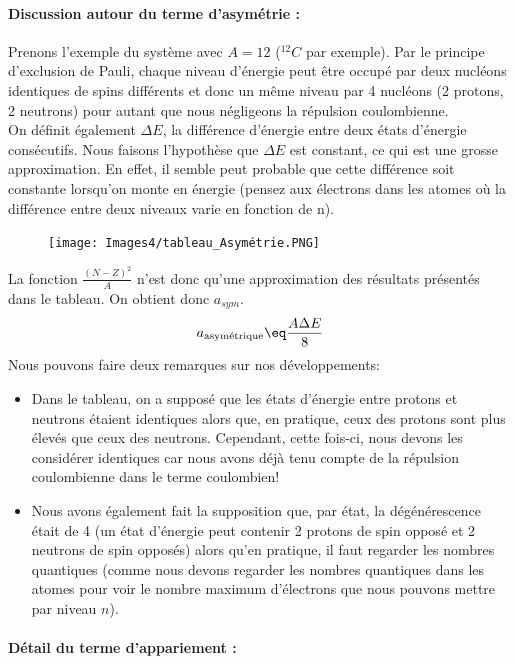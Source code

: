 \paragraph{Discussion autour du terme d'asymétrie :} 


Prenons l'exemple du système avec $A = 12$ ($^{12}C$ par exemple). Par le principe d'exclusion de Pauli, chaque niveau d'énergie peut être occupé par deux nucléons identiques de spins différents et donc un même niveau par 4 nucléons (2 protons, 2 neutrons) pour autant que nous négligeons la répulsion coulombienne.\\
On définit également $\Delta E$, la différence d'énergie entre deux états d'énergie consécutifs. Nous faisons l'hypothèse que $\Delta E$ est constant, ce qui est une grosse approximation. En effet, il semble peut probable que cette différence soit constante lorsqu'on monte en énergie (pensez aux électrons dans les atomes où la différence entre deux niveaux varie en fonction de n).\\
\begin{figure}[ht]
    \centering
    \texttt{[image: Images4/tableau\_Asymétrie.PNG]}
\end{figure}
La fonction $\frac{(N-Z)^2}{A}$ n'est donc qu'une approximation des résultats présentés dans le tableau. On obtient donc $a_{sym}$.
\begin{equation*}
    a_{\text{asymétrique}} \eq \dfrac{A\Delta E}{8}
\end{equation*}
Nous pouvons faire deux remarques sur nos développements:
\begin{itemize}[label=$\bullet$]
    \item Dans le tableau, on a supposé que les états d'énergie entre protons et neutrons étaient identiques alors que, en pratique, ceux des protons sont plus élevés que ceux des neutrons. Cependant, cette fois-ci, nous devons les considérer identiques car nous avons déjà tenu compte de la répulsion coulombienne dans le terme coulombien!
    \item Nous avons également fait la supposition que, par état, la dégénérescence était de 4 (un état d'énergie peut contenir 2 protons de spin opposé et 2 neutrons de spin opposés) alors qu'en pratique, il faut regarder les nombres quantiques (comme nous devons regarder les nombres quantiques dans les atomes pour voir le nombre maximum d'électrons que nous pouvons mettre par niveau $n$).
\end{itemize}

\paragraph{Détail du terme d'appariement :} 


